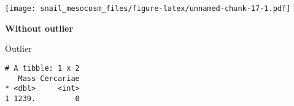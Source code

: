 \documentclass[10,portrait]{article}
\newenvironment{Shaded}{\begin{snugshade}}{\end{snugshade}}
\newcommand{\KeywordTok}[1]{\textcolor[rgb]{0.13,0.29,0.53}{\textbf{#1}}}
\newcommand{\StringTok}[1]{\textcolor[rgb]{0.31,0.60,0.02}{#1}}
\newcommand{\CommentTok}[1]{\textcolor[rgb]{0.56,0.35,0.01}{\textit{#1}}}
\newcommand{\OperatorTok}[1]{\textcolor[rgb]{0.81,0.36,0.00}{\textbf{#1}}}
\newcommand{\NormalTok}[1]{#1}
\begin{document}
\texttt{[image: snail\_mesocosm\_files/figure-latex/unnamed-chunk-17-1.pdf]}

\textbf{Without outlier}

Outlier

\begin{Shaded}
\end{Shaded}

\begin{verbatim}
# A tibble: 1 x 2
   Mass Cercariae
* <dbl>     <int>
1 1239.         0
\end{verbatim}
\end{document}
